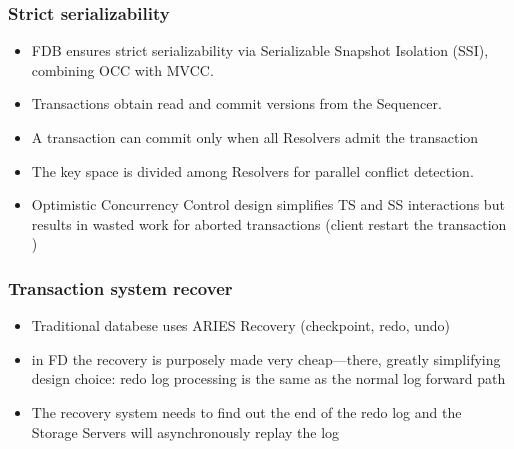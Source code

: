 

\begin{frame}
	\frametitle{Strict serializability}
\begin{itemize}
  \item FDB ensures strict serializability via Serializable Snapshot Isolation (SSI), combining OCC with MVCC.
  \item Transactions obtain read and commit versions from the Sequencer.
  \item A transaction can commit only when all Resolvers admit the transaction
  \item The key space is divided among Resolvers for parallel conflict detection.
  \item Optimistic Concurrency Control design simplifies TS and SS interactions but results in wasted work for aborted transactions (client restart the transaction )
\end{itemize}

 \end{frame}







\begin{frame}
	\frametitle{Transaction system recover}
    \begin{itemize}
    
        \item Traditional databese uses ARIES Recovery (checkpoint, redo, undo)
        \item in FD the recovery is purposely made very cheap—there, greatly simplifying design choice: redo log processing is the same as the normal log forward path
        \item The recovery system needs to find out the end of the redo log and the Storage Servers will asynchronously replay the log
        
\end{itemize}
\end{frame}

